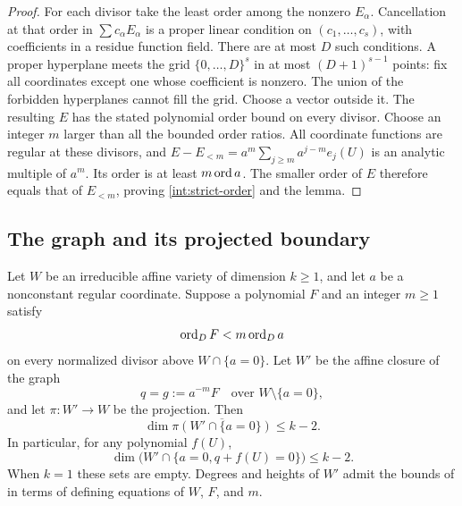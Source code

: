 \begin{proof}
For each divisor take the least order among the nonzero $E_\alpha$.
Cancellation at that order in $\sum c_\alpha E_\alpha$ is a proper
linear condition on $(c_1,\ldots,c_s)$, with coefficients in a residue
function field.  There are at most $D$ such conditions.  A proper
hyperplane meets the grid $\{0,\ldots,D\}^s$ in at most
$(D+1)^{s-1}$ points: fix all coordinates except one whose coefficient
is nonzero.  The union of the forbidden hyperplanes cannot fill the
grid.  Choose a vector outside it.  The resulting $E$ has the stated
polynomial order bound on every divisor.  Choose an integer $m$ larger
than all the bounded order ratios.  All coordinate functions are regular
at these divisors, and
$E-E_{<m}=a^m\sum_{j\geq m}a^{j-m}e_j(U)$ is an analytic multiple
of $a^m$.  Its order is at least $m\operatorname{ord} a$.  The smaller order of
$E$ therefore equals that of $E_{<m}$, proving
\eqref{int:strict-order} and the lemma.
\end{proof}

\subsection{The graph and its projected boundary}

\begin{lemma}\label{int:graph}
Let $W$ be an irreducible affine variety of dimension $k\geq1$, and
let $a$ be a nonconstant regular coordinate.  Suppose a polynomial $F$
and an integer $m\geq1$ satisfy
\[
 \operatorname{ord}_D F<m\operatorname{ord}_Da
\]
on every normalized divisor above $W\cap\{a=0\}$.  Let $W'$ be the
affine closure of the graph
\[
 q=g:=a^{-m}F\quad\text{over }W\setminus\{a=0\},
\]
and let $\pi:W'\to W$ be the projection.  Then
\begin{equation}\label{int:projected-boundary}
 \dim\overline{\pi(W'\cap\{a=0\})}\leq k-2.
\end{equation}
In particular, for any polynomial $f(U)$,
\begin{equation}\label{int:graph-cut}
 \dim\bigl(W'\cap\{a=0, q+f(U)=0\}\bigr)\leq k-2.
\end{equation}
When $k=1$ these sets are empty.  Degrees and heights of $W'$ admit
the bounds of  in terms of defining equations of
$W$, $F$, and $m$.
\end{lemma}


